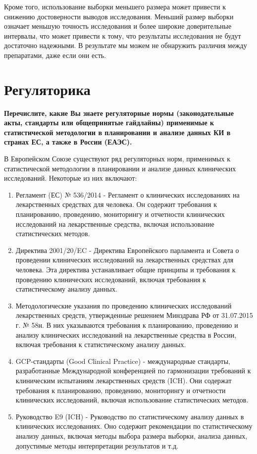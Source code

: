 \documentclass[
]{article}
\begin{document}
Кроме того, использование выборки меньшего размера может привести к
снижению достоверности выводов исследования. Меньший размер выборки
означает меньшую точность исследования и более широкие доверительные
интервалы, что может привести к тому, что результаты исследования не
будут достаточно надежными. В результате мы можем не обнаружить различия
между препаратами, даже если они есть.

\hypertarget{ux440ux435ux433ux443ux43bux44fux442ux43eux440ux438ux43aux430}{%
\section{Регуляторика}\label{ux440ux435ux433ux443ux43bux44fux442ux43eux440ux438ux43aux430}}

\textbf{Перечислите, какие Вы знаете регуляторные нормы (законодательные
акты, стандарты или общепринятые гайдлайны) применимые к статистической
методологии в планировании и анализе данных КИ в странах ЕС, а также в
России (ЕАЭС).}

В Европейском Союзе существуют ряд регуляторных норм, применимых к
статистической методологии в планировании и анализе данных клинических
исследований. Некоторые из них включают:

\begin{enumerate}
\def\labelenumi{\arabic{enumi}.}
\item
  Регламент (ЕС) № 536/2014 - Регламент о клинических исследованиях на
  лекарственных средствах для человека. Он содержит требования к
  планированию, проведению, мониторингу и отчетности клинических
  исследований на лекарственные средства, включая использование
  статистических методов.
\item
  Директива 2001/20/EC - Директива Европейского парламента и Совета о
  проведении клинических исследований на лекарственных средствах для
  человека. Эта директива устанавливает общие принципы и требования к
  проведению клинических исследований, включая требования к
  статистическому анализу данных.
\item
  Методологические указания по проведению клинических исследований
  лекарственных средств, утвержденные решением Минздрава РФ от
  31.07.2015 г. № 58н. В них указываются требования к планированию,
  проведению и анализу клинических исследований на лекарственные
  средства в России, включая требования к статистическому анализу
  данных.
\item
  GCP-стандарты (Good Clinical Practice) - международные стандарты,
  разработанные Международной конференцией по гармонизации требований к
  клиническим испытаниям лекарственных средств (ICH). Они содержат
  требования к планированию, проведению, мониторингу и отчетности
  клинических исследований, включая использование статистических
  методов.
\item
  Руководство E9 (ICH) - Руководство по статистическому анализу данных в
  клинических исследованиях. Оно содержит рекомендации по
  статистическому анализу данных, включая методы выбора размера выборки,
  анализа данных, допустимые методы интерпретации результатов и т.д.
\end{enumerate}
\end{document}
